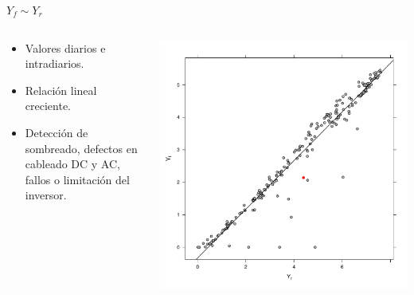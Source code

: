 \documentclass[aspectratio=169, usenames,svgnames,dvipsnames]{beamer}
\begin{document}
\begin{frame}[label={sec:org90d143c}]{\(Y_f \sim Y_r\)}
\begin{columns}
\begin{column}{0.3\columnwidth}
\begin{itemize}
\item Valores diarios e intradiarios.
\item Relación lineal creciente.
\item Detección de sombreado, defectos en cableado DC y AC, fallos o limitación del inversor.
\end{itemize}
\end{column}

\begin{column}{0.7\columnwidth}
\begin{center}
\includegraphics[height=0.95\textheight]{../figs/YfYr.pdf}
\end{center}
\end{column}
\end{columns}
\end{frame}
\end{document}
